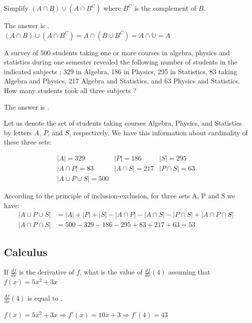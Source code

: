 \begin{question}
Simplify $(A \cap B) \cup (A \cap B^C)$ where $B^C$ is the complement of $B$.
\begin{solution}
The answer is . \\
$(A \cap B) \cup (A \cap B^C) = A \cap (B \cup B^C) = A \cap \mathbb{U} = A$
\end{solution}
\end{question}

\begin{question}
A survey of 500 students taking one or more courses in algebra, physics and statistics during one semester revealed
the following number of students in the indicated subjects : 
329 in Algebra, 186 in Physics, 295 in Statistics, 83 taking Algebra and Physics, 217 Algebra and Statistics, and 63 Physics and Statistics.
How many students took all three subjects ? 
\begin{solution}
The answer is . 
\end{solution}

Let us denote the set of students taking courses Algebra, Physics, and Statistics by letters $A$, $P$, and $S$, respectively. We have this information about cardinality of these three sets:

\begin{equation*}
	\begin{array}{lll}
	 |A| = 329							& |P| = 186				& |S| = 295 \\
	 |A \cap P| = 83				& |A \cap S| = 217	& |P \cap S| = 63 \\
	 |A \cup P \cup S| = 500	& &
	\end{array}
\end{equation*}

According to the principle of inclusion-exclusion, for three sets A, P and S we have:
\begin{align*}
|A \cup P \cup S| &= |A| + |P| + |S| - |A \cap P| - |A \cap S| - |P \cap S| + |A \cap P \cap S|\\
|A \cap P \cap S| &= 500 - 329 - 186 - 295 + 83 + 217 + 63 = 53
\end{align*}
\end{question}

\subsection*{Calculus}

\begin{question}
If $\frac{df}{dx}$ is the derivative of $f$, what is the value of $\frac{df}{dx}(4)$ assuming that 
$f(x) = 5x^2 +3x$ 

\begin{solution}
$\frac{df}{dx}(4)$ is equal to .
\end{solution}

$f(x) = 5x^2 + 3x \Rightarrow f'(x) = 10 x + 3 \Rightarrow f'(4) = 43$
\end{question}

